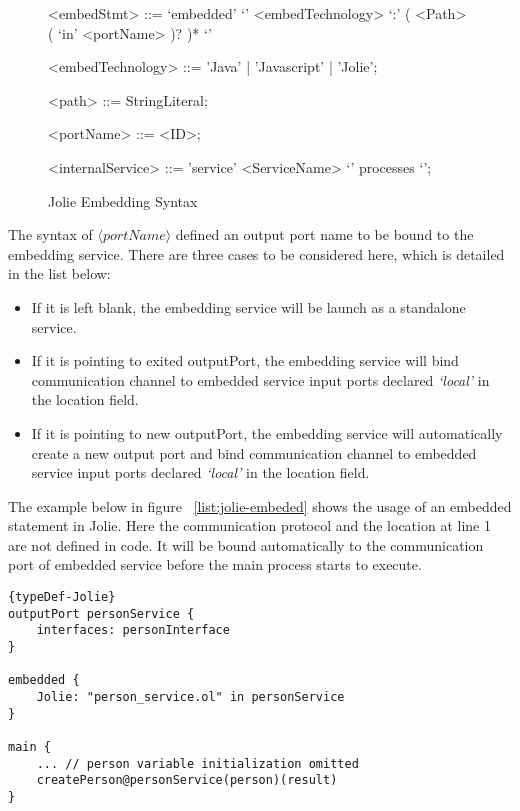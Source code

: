 \begin{figure}[ht]
    \begin{framed}
        \begin{grammar}
            <embedStmt> ::= `embedded' `{' <embedTechnology> `:' ( <Path> ( `in' <portName> )? )* `}'

            <embedTechnology> ::= 'Java' | 'Javascript' | 'Jolie';

            <path> ::= StringLiteral;

            <portName> ::= <ID>;

            <internalService>
            ::= 'service' <ServiceName> `{' processes `}';
        \end{grammar}
    \end{framed}
    \caption{Jolie Embedding Syntax}
    \label{fig:embedded-syntax}
\end{figure}

The syntax of \(\langle portName \rangle\) defined an output port name to be bound to the embedding service. There are three cases to be considered here, which is detailed in the list below:

\begin{itemize}
    \item If it is left blank, the embedding service will be launch as a standalone service.
    \item If it is pointing to exited outputPort, the embedding service will bind communication channel to embedded service input ports declared \textit{`local'} in the location field.
    \item If it is pointing to new outputPort, the embedding service will automatically create a new output port and bind communication channel to embedded service input ports declared \textit{`local'} in the location field.
\end{itemize}

The example below in figure ~\ref{list:jolie-embeded} shows the usage of an embedded statement in Jolie. Here the communication protocol and the location at line 1 are not defined in code. It will be bound automatically to the communication port of embedded service before the main process starts to execute. 

\begin{listing}[ht]

\lstset{language=Jolie,
    style=codeStyle,
    numbers=left,
    firstnumber=1
}
\begin{lstlisting}[frame=tlrb, caption= {Jolie Embedding example}, label={list:jolie-embeded} ]{typeDef-Jolie}
outputPort personService {
    interfaces: personInterface
}

embedded {
    Jolie: "person_service.ol" in personService
}

main {
    ... // person variable initialization omitted
    createPerson@personService(person)(result)
}
\end{lstlisting}
\end{listing}

\FloatBarrier
